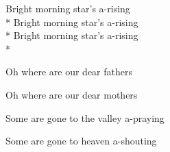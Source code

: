 


\versemark
Bright morning star’s a-rising\\*
Bright morning star’s a-rising\\*
Bright morning star’s a-rising\\*

\versemark
Oh where are our dear fathers\simile

\versemark
Oh where are our dear mothers\simile

\versemark
Some are gone to the valley a-praying\simile

\versemark
Some are gone to heaven a-shouting\repeatfirst

